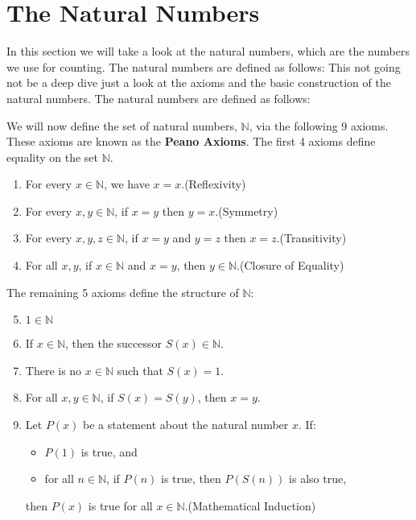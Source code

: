 \section{The Natural Numbers}

In this section we will take a look at the natural numbers, which are the numbers we use for counting. The natural numbers are defined as follows:
This not going not be a deep dive just a look at the axioms and the basic construction of the natural numbers. The natural numbers are defined as follows:

We will now define the set of natural numbers, \( \mathbb{N} \), via the following 9 axioms. These axioms are known as the \textbf{Peano Axioms}. The first 4 axioms define equality on the set \( \mathbb{N} \).

\begin{enumerate}[label=\Roman*.]
	\item For every \( x \in \mathbb{N} \), we have \( x = x \).\hfill (Reflexivity)
	\item For every \( x, y \in \mathbb{N} \), if \( x = y \) then \( y = x \).\hfill (Symmetry)
	\item For every \( x, y, z \in \mathbb{N} \), if \( x = y \) and \( y = z \) then \( x = z \).\hfill (Transitivity)
	\item For all \( x, y \), if \( x \in \mathbb{N} \) and \( x = y \), then \( y \in \mathbb{N} \).\hfill (Closure of Equality)
\end{enumerate}

The remaining 5 axioms define the structure of \( \mathbb{N} \):

\begin{enumerate}[label=\Roman*.]
	\setcounter{enumi}{4}
	\item \( 1 \in \mathbb{N} \)
	\item If \( x \in \mathbb{N} \), then the successor \( S(x) \in \mathbb{N} \).
	\item There is no \( x \in \mathbb{N} \) such that \( S(x) = 1 \).
	\item For all \( x, y \in \mathbb{N} \), if \( S(x) = S(y) \), then \( x = y \).
	\item Let \( P(x) \) be a statement about the natural number \( x \). If:
		\begin{itemize}
			\item \( P(1) \) is true, and
			\item for all \( n \in \mathbb{N} \), if \( P(n) \) is true, then \( P(S(n)) \) is also true,
		\end{itemize}
		then \( P(x) \) is true for all \( x \in \mathbb{N} \).\hfill (Mathematical Induction)
\end{enumerate}

